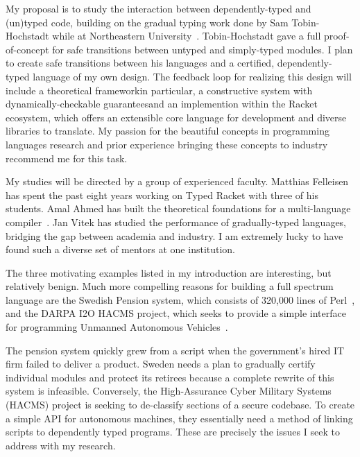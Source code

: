 \documentclass[12pt]{article}
\newcommand{\hdr}[2]{\vspace{-0.4cm}{\flushleft{\hrulefill\\\textbf{#1}\hfill{#2}\\\vspace{-0.2cm}\hrulefill}}\vspace{0.1cm}}
\begin{document}
My proposal is to study the interaction between dependently-typed and (un)typed code, building on the gradual typing work done by Sam Tobin-Hochstadt while at Northeastern University~\cite{tobin2010typed}.
Tobin-Hochstadt gave a full proof-of-concept for safe transitions between untyped and simply-typed modules.
I plan to create safe transitions between his languages and a certified, dependently-typed language of my own design.
The feedback loop for realizing this design will include a theoretical framework\textemdash in particular, a constructive system with dynamically-checkable guarantees\textemdash and an implemention within the Racket ecosystem, which offers an extensible core language for development and diverse libraries to translate.
My passion for the beautiful concepts in programming languages research and prior experience bringing these concepts to industry recommend me for this task.

My studies will be directed by a group of experienced faculty.
Matthias Felleisen has spent the past eight years working on Typed Racket with three of his students.
Amal Ahmed has built the theoretical foundations for a multi-language compiler~\cite{perconti2014verifying}.
Jan Vitek has studied the performance of gradually-typed languages, bridging the gap between academia and industry.
I am extremely lucky to have found such a diverse set of mentors at one institution.

\newpage

\hdr{Broader Impacts}{}

The three motivating examples listed in my introduction are interesting, but relatively benign.
Much more compelling reasons for building a full spectrum language are the Swedish Pension system, which consists of 320,000 lines of Perl~\cite{jantalk}, and the DARPA I2O HACMS project, which seeks to provide a simple interface for programming Unmanned Autonomous Vehicles~\cite{hacms}.

The pension system quickly grew from a script when the government's hired IT firm failed to deliver a product.
Sweden needs a plan to gradually certify individual modules and protect its retirees because a complete rewrite of this system is infeasible.
Conversely, the High-Assurance Cyber Military Systems (HACMS) project is seeking to de-classify sections of a secure codebase.
To create a simple API for autonomous machines, they essentially need a method of linking scripts to dependently typed programs.
These are precisely the issues I seek to address with my research.
\end{document}
